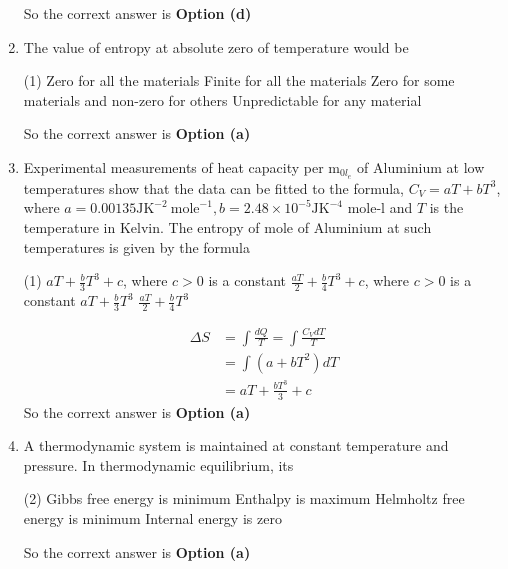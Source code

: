 \begin{enumerate}
\begin{tasks}
\end{tasks}
\begin{answer}
So the corrext answer is \textbf{Option (d)}
\end{answer}
\item The value of entropy at absolute zero of temperature would be
 \begin{tasks}(1)
	\task[\textbf{a.}]Zero for all the materials
	\task[\textbf{b.}]Finite for all the materials
	\task[\textbf{c.}]Zero for some materials and non-zero for others
	\task[\textbf{d.}] Unpredictable for any material
\end{tasks}
\begin{answer}
So the corrext answer is \textbf{Option (a)}
\end{answer}
\item Experimental measurements of heat capacity per $\mathrm{m}_{0 l_{e}}$ of Aluminium at low temperatures show that the data can be fitted to the formula, $C_{V}=a T+b T^{3}$, where $a=0.00135 \mathrm{JK}^{-2} \mathrm{~mole}^{-1}, b=2.48 \times 10^{-5} \mathrm{JK}^{-4}$ mole-l and $T$ is the temperature in Kelvin. The entropy of mole of Aluminium at such temperatures is given by the formula
 \begin{tasks}(1)
	\task[\textbf{a.}]$a T+\frac{b}{3} T^{3}+c$, where $c>0$ is a constant
	\task[\textbf{b.}]$\frac{a T}{2}+\frac{b}{4} T^{3}+c$, where $c>0$ is a constant
	\task[\textbf{c.}]$a T+\frac{b}{3} T^{3}$
	\task[\textbf{d.}] $\frac{a T}{2}+\frac{b}{4} T^{3}$
\end{tasks}
\begin{answer}
	$$
	\begin{aligned}
	\Delta S &=\int \frac{d Q}{T}=\int \frac{C_{V} d T}{T} \\
	&=\int\left(a+b T^{2}\right) d T \\
	&=a T+\frac{b T^{3}}{3}+c
\end{aligned}
$$
So the corrext answer is \textbf{Option (a)}
\end{answer}
\item A thermodynamic system is maintained at constant temperature and pressure. In thermodynamic equilibrium, its
 \begin{tasks}(2)
	\task[\textbf{a.}]Gibbs free energy is minimum
	\task[\textbf{b.}]Enthalpy is maximum
	\task[\textbf{c.}]Helmholtz free energy is minimum
	\task[\textbf{d.}]Internal energy is zero
\end{tasks}
\begin{answer}
So the corrext answer is \textbf{Option (a)}

\end{answer}
\end{enumerate}
